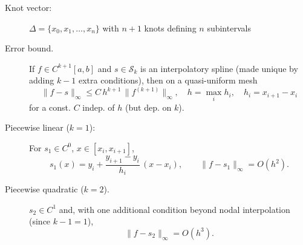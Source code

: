 \documentclass[a4paper,10pt,landscape]{article}
\begin{document}
\begin{multicols*}{3}
\begin{description}
        \item[Knot vector:] $\Delta = \{x_0, x_1, \ldots, x_n\}$ with $n+1$ knots defining $n$ subintervals
        \item[Error bound.] If $f\in C^{k+1}[a,b]$ and $s\in\mathcal{S}_k$ is an interpolatory spline (made unique by adding $k-1$ extra conditions), then on a quasi-uniform mesh
              \[
                  \|f - s\|_\infty \le C\, h^{k+1}\,\|f^{(k+1)}\|_\infty, \quad h=\max_i h_i, \quad h_i=x_{i+1}-x_i
              \]
              for a const. $C$ indep. of $h$ (but dep. on $k$).
        \item[Piecewise linear ($k=1$):] For $s_1 \in C^0$, $x\in[x_i,x_{i+1}]$,
              \[
                  s_1(x)= y_i + \frac{y_{i+1}-y_i}{h_i}\,(x-x_i),
                  \qquad \|f-s_1\|_\infty = O(h^2).
              \]
        \item[Piecewise quadratic ($k=2$).] $s_2\in C^1$ and, with one additional condition beyond nodal interpolation (since $k-1=1$),
              \[
                  \|f-s_2\|_\infty = O(h^3).
              \]
    \end{description}


\end{multicols*}
\end{document}
